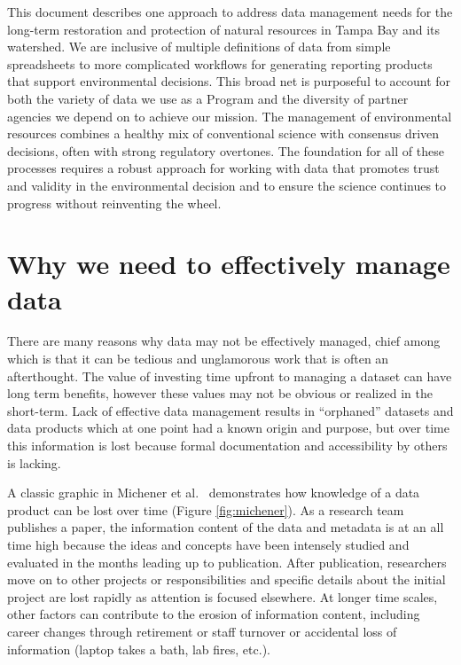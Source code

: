 \documentclass[
]{book}
\begin{document}
This document describes one approach to address data management needs for the long-term restoration and protection of natural resources in Tampa Bay and its watershed. We are inclusive of multiple definitions of data from simple spreadsheets to more complicated workflows for generating reporting products that support environmental decisions. This broad net is purposeful to account for both the variety of data we use as a Program and the diversity of partner agencies we depend on to achieve our mission. The management of environmental resources combines a healthy mix of conventional science with consensus driven decisions, often with strong regulatory overtones. The foundation for all of these processes requires a robust approach for working with data that promotes trust and validity in the environmental decision and to ensure the science continues to progress without reinventing the wheel.

\hypertarget{whymanage}{%
\section{Why we need to effectively manage data}\label{whymanage}}

There are many reasons why data may not be effectively managed, chief among which is that it can be tedious and unglamorous work that is often an afterthought. The value of investing time upfront to managing a dataset can have long term benefits, however these values may not be obvious or realized in the short-term. Lack of effective data management results in ``orphaned'' datasets and data products which at one point had a known origin and purpose, but over time this information is lost because formal documentation and accessibility by others is lacking.

A classic graphic in Michener et al.~\citep{Michener97} demonstrates how knowledge of a data product can be lost over time (Figure \ref{fig:michener}). As a research team publishes a paper, the information content of the data and metadata is at an all time high because the ideas and concepts have been intensely studied and evaluated in the months leading up to publication. After publication, researchers move on to other projects or responsibilities and specific details about the initial project are lost rapidly as attention is focused elsewhere. At longer time scales, other factors can contribute to the erosion of information content, including career changes through retirement or staff turnover or accidental loss of information (laptop takes a bath, lab fires, etc.).
\end{document}

